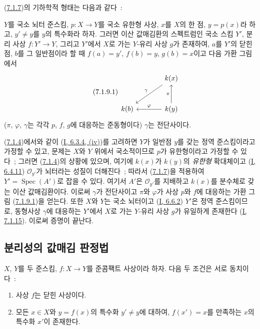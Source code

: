 (\hyperref[II.7.1.7-ko]{7.1.7})의 기하학적 형태는 다음과 같다~:


\begin{proposition}[7.1.9]
\label{II.7.1.9-ko}
$Y$를 국소 뇌터 준스킴, $p:X\to Y$를 국소 유한형 사상,
$x$를 $X$의 한 점, $y=p(x)$라 하고, $y'\neq y$를 $y$의
특수화라 하자. 그러면 이산 값매김환의 스펙트럼인 국소 스킴 $Y'$,
분리 사상 $f:Y'\to Y$, 그리고 $Y'$에서 $X$로 가는 $Y$-유리 사상
$g$가 존재하여, $a$를 $Y'$의 닫힌점, $b$를 그 일반점이라 할 때
$f(a)=y'$, $f(b)=y$, $g(b)=x$이고 다음 가환 그림에서
\[
\tag{7.1.9.1}
\label{II.7.1.9.1-ko}
\begin{tikzcd}[column sep=large,row sep=large]
& k(x) \arrow[dl,"\gamma"'] \\
k(b) & k(y) \arrow[u,"\pi"] \arrow[l,"\varphi"']
\end{tikzcd}
\]
($\pi$, $\varphi$, $\gamma$는 각각 $p$, $f$, $g$에 대응하는
준동형이다) $\gamma$는 전단사이다.
\end{proposition}

(\hyperref[II.7.1.4-ko]{7.1.4})에서와 같이
(\hyperref[I.6.3.4-ko]{I, 6.3.4, (iv)})를 고려하면 $Y$가 일반점 $y$를
갖는 정역 준스킴이라고 가정할 수 있고, 문제는 $X$와 $Y$ 위에서 국소적이므로
$p$가 유한형이라고 가정할 수 있다~; 그러면
(\hyperref[II.7.1.4-ko]{7.1.4})의 상황에 있으며, 여기에 $k(x)$가
$k(y)$의 \emph{유한형} 확대체이고
(\hyperref[I.6.4.11-ko]{I, 6.4.11}) $\mathcal{O}_{y'}$가 뇌터라는
성질이 더해진다~; 따라서 (\hyperref[II.7.1.7-ko]{7.1.7})을 적용하여
$Y'=\operatorname{Spec}(A')$로 잡을 수 있다. 여기서 $A'$은
$\mathcal{O}_{y'}$를 지배하고 $k(x)$를 분수체로 갖는 이산 값매김환이다.
이로써 $\gamma$가 전단사이고 $\pi$와 $\varphi$가 사상 $p$와 $f$에
대응하는 가환 그림 (\hyperref[II.7.1.9.1-ko]{7.1.9.1})을 얻는다.
또한 $X$와 $Y$는 국소 뇌터이고
(\hyperref[I.6.6.2-ko]{I, 6.6.2}) $Y'$은 정역 준스킴이므로, 동형사상
$\gamma$에 대응하는 $Y'$에서 $X$로 가는 $Y$-유리 사상 $g$가
유일하게 존재한다 (\hyperref[I.7.1.15-ko]{I, 7.1.15}). 이로써 증명이
끝난다.

\subsection{분리성의 값매김 판정법}
\label{subsection:II.7.2-ko}

\begin{proposition}[7.2.1]
\label{II.7.2.1-ko}
$X$, $Y$를 두 준스킴, $f:X\to Y$를 준콤팩트 사상이라 하자. 다음 두
조건은 서로 동치이다~:
\begin{enumerate}
\item[\rm a)] 사상 $f$는 닫힌 사상이다.
\item[\rm b)] 모든 $x\in X$와 $y=f(x)$의 특수화 $y'\neq y$에 대하여,
$f(x')=x$를 만족하는 $x$의 특수화 $x'$이 존재한다.
\end{enumerate}
\end{proposition}

